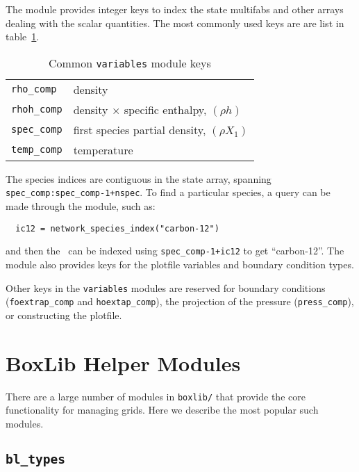 \label{sec:variables_module}

The  module provides integer keys to index the state
multifabs and other arrays dealing with the scalar quantities.  The
most commonly used keys are are list in table~\ref{arch:table:variables}.

\begin{table}[h]
\caption{\label{arch:table:variables} Common {\tt variables} module keys}
\begin{center}
\begin{tabular}{ll}
\hline
{\tt rho\_comp}  & density \\
{\tt rhoh\_comp} & density $\times$ specific enthalpy, $(\rho h)$ \\
{\tt spec\_comp} & first species partial density, $(\rho X_1)$ \\
{\tt temp\_comp} & temperature \\
\hline
\end{tabular}
\end{center}
\end{table}

The species indices are contiguous in the state array, spanning {\tt
  spec\_comp:spec\_comp-1+nspec}.  To find a particular species, a
query can be made through the  module, such as:
\begin{verbatim}
  ic12 = network_species_index("carbon-12")
\end{verbatim}
and then the \fab\ can be indexed using {\tt spec\_comp-1+ic12} to
get ``carbon-12''.
The  module also provides keys for the plotfile
variables and boundary condition types.

Other keys in the {\tt variables} modules are reserved for boundary
conditions ({\tt foextrap\_comp} and {\tt hoextap\_comp}), the
projection of the pressure ({\tt press\_comp}), or constructing
the plotfile.


\section{BoxLib Helper Modules}

There are a large number of modules in {\tt boxlib/} that provide
the core functionality for managing grids.  Here we describe
the most popular such modules.


\subsection{{\tt bl\_types}}

